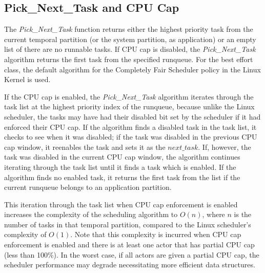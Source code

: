 \vspace{-0.1in}
\fi
\subsection{Pick\_Next\_Task and CPU Cap}
The \emph{Pick\_Next\_Task} function returns  either the highest
priority task from the current temporal partition (or the system
partition, as application) or an empty list of there are no runnable
tasks.  
 If CPU cap is disabled, the
\emph{Pick\_Next\_Task} algorithm returns the first task from the specified
runqueue. For the best effort class, the default algorithm for the
Completely Fair Scheduler policy in the Linux Kernel
\cite{mauerer2008} is used.

  If the CPU cap is enabled,
the \emph{Pick\_Next\_Task} algorithm iterates through the task list
at the highest priority index of the runqueue, because unlike the
Linux scheduler, the tasks may have had their disabled bit set by the
scheduler if it had enforced their CPU cap.  If the algorithm finds a
disabled task in the task list, it checks to see when it was disabled;
if the task was disabled in the previous CPU cap window, it reenables the
task and sets it as the $next\_task$.  If, however, the task
was disabled in the current CPU cap window, the algorithm continues
iterating through the task list until it finds a task which is
enabled.  If the algorithm finds no enabled task, it returns the first
task from the list if the current runqueue belongs to an application partition. 


This iteration through the task list when CPU cap
enforcement is enabled increases the complexity of the scheduling algorithm to
$O(n)$, where $n$ is the number of tasks in that temporal partition,
compared to the Linux scheduler's complexity of $O(1)$.  Note that
this complexity is incurred when CPU cap enforcement is
enabled and there is at least one actor that has partial CPU cap (less
than 100\%).  In the worst case, if all actors are given a partial CPU
cap, the scheduler performance may degrade necessitating more
efficient data structures. 

